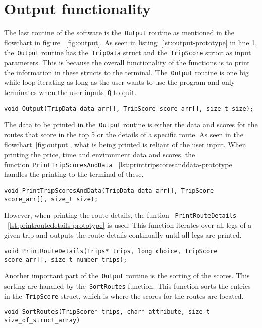 \section{Output functionality}\label{sec:output-functionality}

The last routine of the software is the~\texttt{Output} routine as mentioned in the flowchart in figure
~\ref{fig:output}.
As seen in listing~\ref{lst:output-prototype} in line 1, the~\texttt{Output} routine has the~\texttt{TripData} struct
and the~\texttt{TripScore} struct as input parameters.
This is because the overall functionality of the functions is to print the information in these structs to the terminal.
The~\texttt{Output} routine is one big while-loop iterating as long as the user wants to use the program and only
terminates when the user inputs~\texttt{Q} to quit.

\begin{lstlisting}[caption={Function prototype for~\texttt{Output}}, label={lst:output-prototype}, captionpos=b]
void Output(TripData data_arr[], TripScore score_arr[], size_t size);
\end{lstlisting}

The data to be printed in the~\texttt{Output} routine is either the data and scores for the routes that score in the top
5 or the details of a specific route.
As seen in the flowchart~\ref{fig:output}, what is being printed is reliant of the user input.
When printing the price, time and environment data and scores, the function~\texttt{PrintTripScoresAndData}
~\ref{lst:printtripscoresanddata-prototype} handles the printing to the terminal of these.

\begin{lstlisting}[caption={Function prototype for~\texttt{PrintTripScoresAndData}},
    label={lst:printtripscoresanddata-prototype}, captionpos=b]
void PrintTripScoresAndData(TripData data_arr[], TripScore score_arr[], size_t size);
\end{lstlisting}

However, when printing the route details, the funtion ~\texttt{PrintRouteDetails}
~\ref{lst:printroutedetails-prototype} is used.
This function iterates over all legs of a given trip and outputs the route details continually until all legs are
printed.

\begin{lstlisting}[caption={Function prototype for~\texttt{PrintRouteDetails}},
    label={lst:printroutedetails-prototype}, captionpos=b]
void PrintRouteDetails(Trips* trips, long choice, TripScore score_arr[], size_t number_trips);
\end{lstlisting}

Another important part of the~\texttt{Output} routine is the sorting of the scores.
This sorting are handled by the~\texttt{SortRoutes} function.
This function sorts the entries in the~\texttt{TripScore} struct, which is where the scores for the routes are located.

\begin{lstlisting}[caption={Function prototype for~\texttt{SortRoutes}}, label={lst:sortroutes-prototype},
    captionpos=b]
void SortRoutes(TripScore* trips, char* attribute, size_t size_of_struct_array)
\end{lstlisting}
